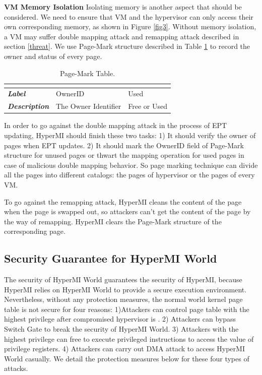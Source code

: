 \documentclass[conference]{IEEEtran}
\begin{document}
\textbf{VM Memory Isolation}
Isolating memory is another aspect that should be considered. We need to ensure that VM and the hypervisor can only access their own corresponding memory, as shown in Figure \ref{fig3}.
Without memory isolation, a VM may suffer double mapping attack and remapping attack described in section \ref{threat}. We use Page-Mark structure described in Table \ref{tab2} to record the owner and status of every page. 

\begin{table}
\centering
\caption{Page-Mark Table.}\label{tab2}
\begin{tabular}{p{1.2cm}|p{1.4cm}|p{1.5cm}}
\hline
\multicolumn{3}{c}{\bfseries\textbf\centering{Page-Mark Table}}\\
\hline
{\itshape\bfseries Label} & OwnerID & Used \\
\hline
{\itshape\bfseries Description} & The Owner Identifier & Free or Used \\
\hline
\end{tabular}
\end{table}

In order to go against the double mapping attack in the process of EPT updating, HyperMI should finish these two tasks: 1) It should verify the owner of pages when EPT updates. 2) It should mark the OwnerID field of Page-Mark structure for unused pages or thwart the mapping operation for used pages in case of malicious double mapping behavior. So page marking technique can divide all the pages into different catalogs: the pages of hypervisor or the pages of every VM.

To go against the remapping attack, HyperMI cleans the content of the page when the page is swapped out, so attackers can't get the content of the page by the way of remapping. HyperMI clears the Page-Mark structure of the corresponding page. 





\subsection{Security Guarantee for HyperMI World}\label {SG}
The security of HyperMI World guarantees the security of HyperMI, because HyperMI relies on HyperMI World to provide a secure execution environment.
Nevertheless, without any protection measures, the normal world kernel page table is not secure for four reasons: 1)Attackers can control page table with the highest privilege after compromised hypervisor is . 2) Attackers can bypass Switch Gate to break the security of HyperMI World. 3) Attackers with the highest privilege can free to execute privileged instructions to access the value of privilege registers. 4) Attackers can carry out DMA attack to access HyperMI World casually.
We detail the protection measures below for these four types of attacks.
\end{document}

